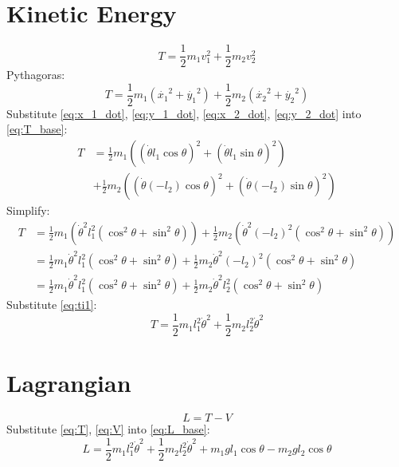 \documentclass[titlepage]{article}
\numberwithin{equation}{section}
\begin{document}
\section{Kinetic Energy}
\begin{equation}
T = \frac{1}{2} m_1 v_1^2 + \frac{1}{2} m_2 v_2^2
\end{equation}
Pythagoras:
\begin{equation} \label{eq:T_base}
T = \frac{1}{2} m_1 (\dot{x_1}^2 + \dot{y_1}^2) + \frac{1}{2} m_2 (\dot{x_2}^2 + \dot{y_2}^2)
\end{equation}
Substitute \ref{eq:x_1_dot}, \ref{eq:y_1_dot}, \ref{eq:x_2_dot}, \ref{eq:y_2_dot} into \ref{eq:T_base}:
\begin{align}
T &= \frac{1}{2} m_1 ((\dot{\theta} l_1 \cos \theta)^2 + (\dot{\theta} l_1 \sin \theta)^2) \nonumber \\
  &+ \frac{1}{2} m_2 ((\dot{\theta} (-l_2) \cos \theta)^2 + (\dot{\theta} (-l_2) \sin \theta)^2)
\end{align}
Simplify:
\begin{align}
T &= \frac{1}{2} m_1 (\dot{\theta}^2 l_1^2 (\cos^2 \theta + \sin^2 \theta)) + \frac{1}{2} m_2 (\dot{\theta}^2 (-l_2)^2 (\cos^2 \theta + \sin^2 \theta)) \\
  &= \frac{1}{2} m_1 \dot{\theta}^2 l_1^2 (\cos^2 \theta + \sin^2 \theta) + \frac{1}{2} m_2 \dot{\theta}^2 (-l_2)^2 (\cos^2 \theta + \sin^2 \theta) \\
  &= \frac{1}{2} m_1 \dot{\theta}^2 l_1^2 (\cos^2 \theta + \sin^2 \theta) + \frac{1}{2} m_2 \dot{\theta}^2 l_2^2 (\cos^2 \theta + \sin^2 \theta)
\end{align}
Substitute \ref{eq:ti1}:
\begin{equation} \label{eq:T}
T = \frac{1}{2} m_1 l_1^2 \dot{\theta}^2 + \frac{1}{2} m_2 l_2^2 \dot{\theta}^2
\end{equation}

\section{Lagrangian}
\begin{equation} \label{eq:L_base}
L = T - V
\end{equation}
Substitute \ref{eq:T}, \ref{eq:V} into \ref{eq:L_base}:
\begin{equation}
L = \frac{1}{2} m_1 l_1^2 \dot{\theta}^2 + \frac{1}{2} m_2 l_2^2 \dot{\theta}^2 + m_1 g l_1 \cos \theta - m_2 g l_2 \cos \theta
\end{equation}
\end{document}
